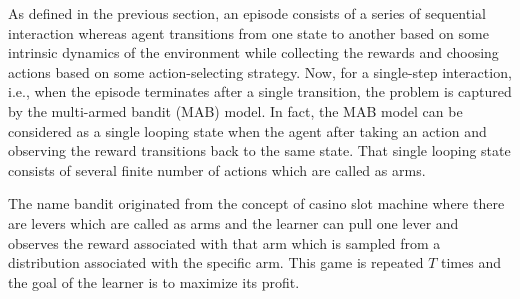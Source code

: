 As defined in the previous section, an episode consists of a series of sequential interaction whereas agent transitions from one state to another based on some intrinsic dynamics of the environment while collecting the rewards and choosing actions based on some action-selecting strategy. Now, for a single-step interaction, i.e., when the episode terminates after a single transition, the problem is captured by the multi-armed bandit (MAB) model. In fact, the MAB model can be considered as a single looping state when the agent after taking an action and observing the reward transitions back to the same state. That single looping state consists of several finite number of actions which are called as arms.

    The name bandit originated from the concept of casino slot machine where there are levers which are called as arms and the learner can pull one lever and observes the reward associated with that arm which is sampled from a distribution associated with the specific arm. This game is repeated $T$ times and the goal of the learner is to maximize its profit. 
